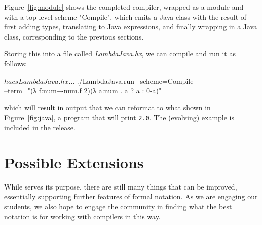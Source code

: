 \documentclass[letterpaper]{llncs}
\begin{document}
\begin{example}
  Figure~\ref{fig:module} shows the completed compiler, wrapped as a module and with a top-level
  scheme "Compile", which emits a Java class with the result of first adding types, translating to
  Java expressions, and finally wrapping in a Java class, corresponding to the previous sections.

  Storing this into a \HAX file called \emph{LambdaJava.hx}, we can compile and run it as follows:
  \begin{code}
    $ hacs LambdaJava.hx
    …
    $ ./LambdaJava.run --scheme=Compile \\
            --term="(λ f:num→num.f 2)(λ a:num . a ? a : 0-a)"
  \end{code}
  which will result in output that we can reformat to what shown in Figure~\ref{fig:java}, a program
  that will print \texttt{2.0}. The (evolving) example is included in the \HAX release.
\end{example}


\section{Possible Extensions}
\label{sec:further}

While \HAX serves its purpose, there are still many things that can be improved, essentially
supporting further features of formal notation. As we are engaging our students, we also hope to
engage the community in finding what the best notation is for working with compilers in this way.
\end{document}
